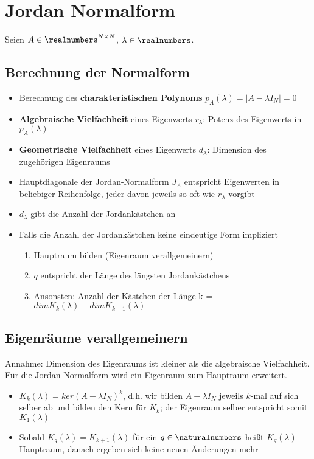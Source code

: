 \section{Jordan Normalform}%
\label{jd:sec:jordan_normalform}

Seien $A \in \realnumbers^{N\times N}$, $\lambda \in \realnumbers$.

\subsection{Berechnung der Normalform}%
\label{jd:sub:berechnung_der_normalform}

\begin{itemize}
	\item Berechnung des \textbf{charakteristischen Polynoms} $p_A(\lambda) = |A - \lambda I_N| = 0$
	\item \textbf{Algebraische Vielfachheit} eines Eigenwerts $r_\lambda$: Potenz des Eigenwerts in $p_A(\lambda)$
	\item \textbf{Geometrische Vielfachheit} eines Eigenwerts $d_\lambda$: Dimension des zugehörigen Eigenraums
	\item Hauptdiagonale der Jordan-Normalform $J_A$ entspricht Eigenwerten in beliebiger Reihenfolge, jeder davon jeweils so oft wie $r_\lambda$ vorgibt
	\item $d_\lambda$ gibt die Anzahl der Jordankästchen an
	\item Falls die Anzahl der Jordankästchen keine eindeutige Form impliziert
		\begin{enumerate}
			\item Hauptraum bilden (Eigenraum verallgemeinern)
			\item $q$ entspricht der Länge des längsten Jordankästchens
			\item Ansonsten: Anzahl der Kästchen der Länge k = $dim K_k(\lambda) - dim K_{k - 1}(\lambda)$
		\end{enumerate}
\end{itemize}

\subsection{Eigenräume verallgemeinern}%
\label{jd:sub:eigenraeume_verallgemeinern}

Annahme: Dimension des Eigenraums ist kleiner als die algebraische Vielfachheit. Für die Jordan-Normalform wird ein Eigenraum zum Hauptraum erweitert.
\begin{itemize}
	\item $K_k(\lambda) = ker(A - \lambda I_N)^k$, d.h. wir bilden $A - \lambda I_N$ jeweils $k$-mal auf sich selber ab und bilden den Kern für $K_k$; der Eigenraum selber entspricht somit $K_1(\lambda)$
	\item Sobald $K_q(\lambda) = K_{k + 1}(\lambda)$ für ein $q \in \naturalnumbers$ heißt $K_q(\lambda)$ Hauptraum, danach ergeben sich keine neuen Änderungen mehr
\end{itemize}

